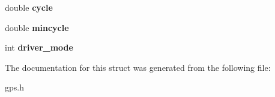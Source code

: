 \begin{DoxyCompactItemize}
\item 
\hypertarget{structdevconfig__t_a2382817d7af6f3c598a47da8060758ac}{double {\bfseries cycle}}\label{structdevconfig__t_a2382817d7af6f3c598a47da8060758ac}

\item 
\hypertarget{structdevconfig__t_a539c9c8319485324d5d60026f2346f73}{double {\bfseries mincycle}}\label{structdevconfig__t_a539c9c8319485324d5d60026f2346f73}

\item 
\hypertarget{structdevconfig__t_aa94bb48eced692097b4ee3a985b29ff8}{int {\bfseries driver\-\_\-mode}}\label{structdevconfig__t_aa94bb48eced692097b4ee3a985b29ff8}

\end{DoxyCompactItemize}


\-The documentation for this struct was generated from the following file\-:\begin{DoxyCompactItemize}
\item 
gps.\-h\end{DoxyCompactItemize}
